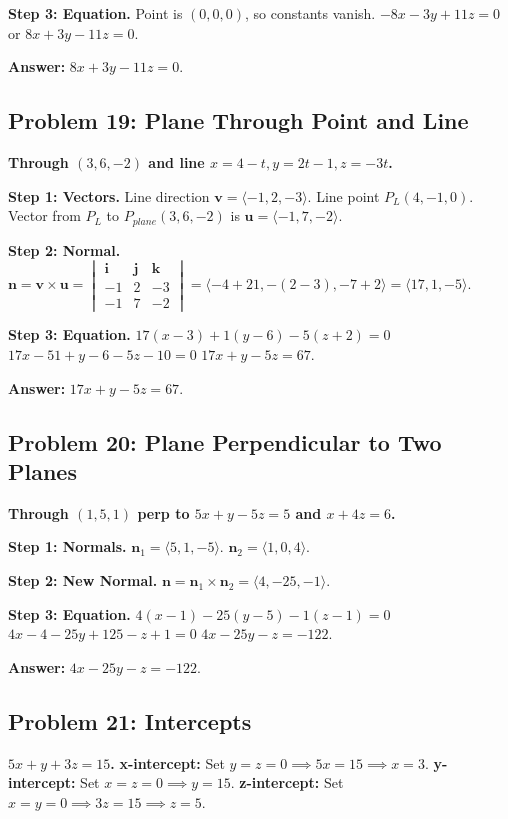 \documentclass[11pt]{article}
\begin{document}
\textbf{Step 3: Equation.}
Point is $(0,0,0)$, so constants vanish.
$-8x - 3y + 11z = 0$ or $8x + 3y - 11z = 0$.

\textbf{Answer:}
$8x + 3y - 11z = 0$.

\hrulefill

\subsection*{Problem 19: Plane Through Point and Line}
\textbf{Through $(3, 6, -2)$ and line $x=4-t, y=2t-1, z=-3t$.}

\textbf{Step 1: Vectors.}
Line direction $\mathbf{v} = \langle -1, 2, -3 \rangle$.
Line point $P_L(4, -1, 0)$.
Vector from $P_L$ to $P_{plane}(3,6,-2)$ is $\mathbf{u} = \langle -1, 7, -2 \rangle$.

\textbf{Step 2: Normal.}
$\mathbf{n} = \mathbf{v} \times \mathbf{u} = \begin{vmatrix} \mathbf{i} & \mathbf{j} & \mathbf{k} \\ -1 & 2 & -3 \\ -1 & 7 & -2 \end{vmatrix} = \langle -4+21, -(2-3), -7+2 \rangle = \langle 17, 1, -5 \rangle$.

\textbf{Step 3: Equation.}
$17(x-3) + 1(y-6) - 5(z+2) = 0$
$17x - 51 + y - 6 - 5z - 10 = 0$
$17x + y - 5z = 67$.

\textbf{Answer:}
$17x + y - 5z = 67$.

\hrulefill

\subsection*{Problem 20: Plane Perpendicular to Two Planes}
\textbf{Through $(1, 5, 1)$ perp to $5x+y-5z=5$ and $x+4z=6$.}

\textbf{Step 1: Normals.}
$\mathbf{n}_1 = \langle 5, 1, -5 \rangle$.
$\mathbf{n}_2 = \langle 1, 0, 4 \rangle$.

\textbf{Step 2: New Normal.}
$\mathbf{n} = \mathbf{n}_1 \times \mathbf{n}_2 = \langle 4, -25, -1 \rangle$.

\textbf{Step 3: Equation.}
$4(x-1) - 25(y-5) - 1(z-1) = 0$
$4x - 4 - 25y + 125 - z + 1 = 0$
$4x - 25y - z = -122$.

\textbf{Answer:}
$4x - 25y - z = -122$.

\hrulefill

\subsection*{Problem 21: Intercepts}
\textbf{$5x + y + 3z = 15$.}
\textbf{x-intercept:} Set $y=z=0 \implies 5x=15 \implies x=3$.
\textbf{y-intercept:} Set $x=z=0 \implies y=15$.
\textbf{z-intercept:} Set $x=y=0 \implies 3z=15 \implies z=5$.
\end{document}
